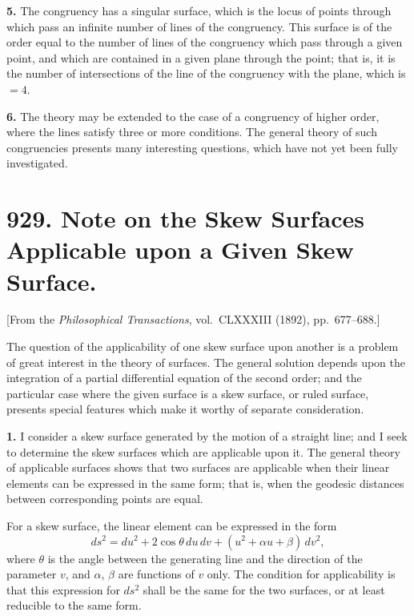 \documentclass[11pt,a4paper]{book}
\begin{document}
\textbf{5.} The congruency has a singular surface, which is the locus of points
through which pass an infinite number of lines of the congruency. This surface
is of the order equal to the number of lines of the congruency which pass through
a given point, and which are contained in a given plane through the point; that is,
it is the number of intersections of the line of the congruency with the plane, which
is $= 4$.

\textbf{6.} The theory may be extended to the case of a congruency of higher
order, where the lines satisfy three or more conditions. The general theory of such
congruencies presents many interesting questions, which have not yet been fully
investigated.



\newpage
\section*{929. Note on the Skew Surfaces Applicable upon a Given Skew Surface.}

[From the \textit{Philosophical Transactions}, vol.~CLXXXIII (1892), pp.~677--688.]

\bigskip

The question of the applicability of one skew surface upon another is a
problem of great interest in the theory of surfaces. The general solution depends
upon the integration of a partial differential equation of the second order; and the
particular case where the given surface is a skew surface, or ruled surface, presents
special features which make it worthy of separate consideration.

\textbf{1.} I consider a skew surface generated by the motion of a straight line;
and I seek to determine the skew surfaces which are applicable upon it. The
general theory of applicable surfaces shows that two surfaces are applicable when
their linear elements can be expressed in the same form; that is, when the
geodesic distances between corresponding points are equal.

For a skew surface, the linear element can be expressed in the form
\[
ds^2 = du^2 + 2\cos\theta\,du\,dv + (u^2 + \alpha u + \beta)\,dv^2,
\]
where $\theta$ is the angle between the generating line and the direction of the parameter
$v$, and $\alpha$, $\beta$ are functions of $v$ only. The condition for applicability is that this
expression for $ds^2$ shall be the same for the two surfaces, or at least reducible to
the same form.
\end{document}
